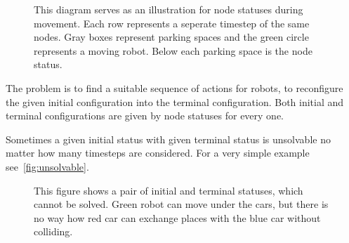 \begin{figure}[h]
    \begin{center}
        
        \caption{This diagram serves as an illustration for node statuses
            during movement. Each row represents a seperate timestep of the
            same nodes. Gray boxes represent parking spaces and the green
            circle represents a moving robot. Below each parking space is the node
        status.}
        \label{fig:movingstatus}
    \end{center}
\end{figure}

The problem is to find a suitable sequence of actions for robots, to
reconfigure the given initial configuration into the terminal configuration.
Both initial and terminal configurations are given by node statuses for every
one.

Sometimes a given initial status with given terminal status is unsolvable no
matter how many timesteps are considered. For a very simple example
see~\autoref{fig:unsolvable}.

\begin{figure}[h]
    \begin{center}
        
        \caption{This figure shows a pair of initial and terminal statuses,
            which cannot be solved. Green robot can move under the cars, but there
            is no way how red car can exchange places with the blue car without
        colliding.}
        \label{fig:unsolvable}
    \end{center}
\end{figure}

